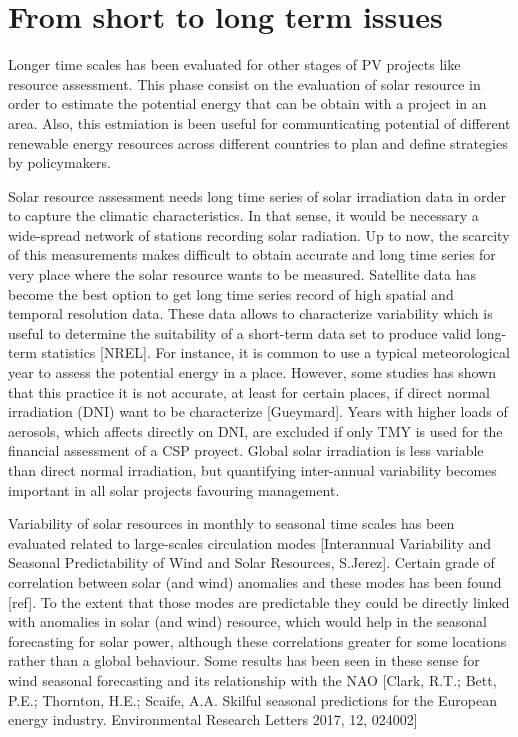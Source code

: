 \section{From short to long term issues}

Longer time scales has been evaluated for other stages of PV projects like resource assessment. This phase consist on the evaluation of solar resource in order to estimate the potential energy that can be obtain with a project in an area. Also, this estmiation is been useful for communticating potential of different renewable energy resources across different countries to plan and define strategies by policymakers.

Solar resource assessment needs long time series of solar irradiation data in order to capture the climatic characteristics. In that sense, it would be necessary a wide-spread network of stations recording solar radiation. Up to now, the scarcity of this measurements makes difficult to obtain accurate and long time series for very place where the solar resource wants to be measured. Satellite data has become the best option to get long time series record of high spatial and temporal resolution data. These data allows to characterize variability which is useful to determine the suitability of a short-term data set to produce valid long-term statistics [NREL]. For instance, it is common to use a typical meteorological year to assess the potential energy in a place. However, some studies has shown that this practice it is not accurate, at least for certain places, if direct normal irradiation (DNI) want to be characterize [Gueymard]. Years with higher loads of aerosols, which affects directly on DNI, are excluded if only TMY is used for the financial assessment of a CSP proyect. Global solar irradiation is less variable than direct normal irradiation, but quantifying inter-annual variability becomes important in all solar projects favouring management.


Variability of solar resources in monthly to seasonal time scales has been evaluated related to large-scales circulation modes [Interannual Variability and Seasonal Predictability of Wind and Solar Resources, S.Jerez]. Certain grade of correlation between solar (and wind) anomalies and these modes has been found [ref]. To the extent that those modes are predictable they could be directly linked with anomalies in solar (and wind) resource, which would help in the seasonal forecasting for solar power, although these correlations greater for some locations rather than a global behaviour. Some results has been seen in these sense for wind seasonal forecasting and its relationship with the NAO [Clark, R.T.; Bett, P.E.; Thornton, H.E.; Scaife, A.A. Skilful seasonal predictions for the European energy industry. Environmental Research Letters 2017, 12, 024002]


